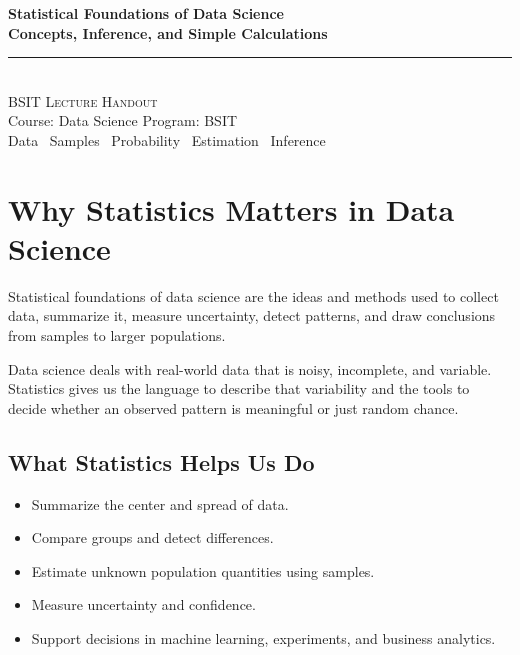 \documentclass[11pt,a4paper]{article}
\begin{document}
\begin{center}
\vspace*{0.5cm}
{\Huge\bfseries\textcolor{primary}{Statistical Foundations of Data Science}}\\[8pt]
{\Large\bfseries\textcolor{primary}{Concepts, Inference, and Simple Calculations}}\\[16pt]
{\color{secondary}\rule{0.74\textwidth}{1.5pt}}\\[12pt]
{\Large\textsc{BSIT Lecture Handout}}\\[6pt]
{\large\textcolor{gray!70!black}{Course: Data Science \quad Program: BSIT}}\\[8pt]
{\normalsize\textcolor{gray!70!black}{Data \textbullet\ Samples \textbullet\ Probability \textbullet\ Estimation \textbullet\ Inference}}
\vspace{0.3cm}
\end{center}

\tableofcontents
\newpage

\section{Why Statistics Matters in Data Science}

\begin{definitionbox}
Statistical foundations of data science are the ideas and methods used to collect data, summarize it, measure uncertainty, detect patterns, and draw conclusions from samples to larger populations.
\end{definitionbox}

\begin{conceptbox}
Data science deals with real-world data that is noisy, incomplete, and variable. Statistics gives us the language to describe that variability and the tools to decide whether an observed pattern is meaningful or just random chance.
\end{conceptbox}

\subsection{What Statistics Helps Us Do}

\begin{itemize}[leftmargin=*]
  \item Summarize the center and spread of data.
  \item Compare groups and detect differences.
  \item Estimate unknown population quantities using samples.
  \item Measure uncertainty and confidence.
  \item Support decisions in machine learning, experiments, and business analytics.
\end{itemize}
\end{document}
